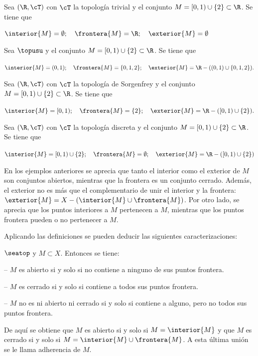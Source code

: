 \begin{ejs}\label{ej:11}
    \item Sea $(\R, \cT)$ con $\cT$ la topología trivial y el conjunto $M = [0,1)\cup \{2\}\subset \R$. Se tiene que 
    \begin{center}
        $\interior{M} = \emptyset;\quad \frontera{M} = \R;\quad \exterior{M} = \emptyset$
    \end{center}
    \item Sea $\topusu$ y el conjunto $M = [0,1)\cup \{2\}\subset \R$. Se tiene que 
    \begin{center}
        $\interior{M} = (0,1);\quad \frontera{M} = \{0,1,2\};\quad \exterior{M} = \R - ((0,1)\cup \{0,1,2\}).$
    \end{center}
    \item Sea $(\R,\cT)$ con $\cT$ la topología de Sorgenfrey y el conjunto $M = [0,1)\cup \{2\}\subset \R$. Se tiene que 
    \begin{center}
        $\interior{M} = [0,1);\quad \frontera{M} = \{2\};\quad \exterior{M} = \R - ([0,1)\cup \{2\}).$
    \end{center}
    \item Sea $(\R,\cT)$ con $\cT$ la topología discreta y el conjunto $M = [0,1)\cup \{2\}\subset \R$. Se tiene que 
    \begin{center}
        $\interior{M} = [0,1)\cup \{2\};\quad \frontera{M} = \emptyset;\quad \exterior{M} = \R - ([0,1)\cup \{2\})$
    \end{center}    
\end{ejs}

En los ejemplos anteriores se aprecia que tanto el interior como el exterior de $M$ son conjuntos abiertos, mientras que la frontera es un conjunto cerrado. Además, el exterior no es más que el complementario de unir el interior y la frontera: $\exterior{M} = X - (\interior{M} \cup \frontera{M})$. Por otro lado, se aprecia que los puntos interiores a $M$ pertenecen a $M$, mientras que los puntos frontera pueden o no pertenecer a $M$. \bigskip

Aplicando las definiciones se pueden deducir las siguientes caracterizaciones:
\begin{prop}
    $\seatop$ y $M\subset X$. Entonces se tiene:
    \item -- $M$ es abierto si y solo si no contiene a ninguno de sus puntos frontera.
    \item -- $M$ es cerrado si y solo si contiene a todos sus puntos frontera.
    \item -- $M$ no es ni abierto ni cerrado si y solo si contiene a alguno, pero no todos sus puntos frontera.
\end{prop}
De aquí se obtiene que $M$ es abierto si y solo si $M = \interior{M}$ y que $M$ es cerrado si y solo si $M = \interior{M} \cup \frontera{M}$. A esta última unión se le llama adherencia de $M$.

